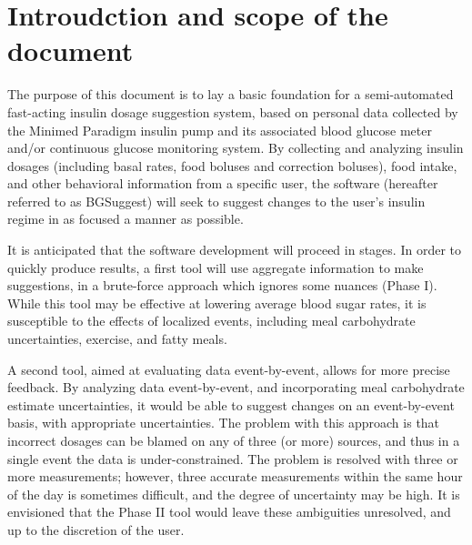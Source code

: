 



\def\hbac{\ensuremath{\text{HbA}_\text{1c}}}
\def\mgdl{\ensuremath{\text{mg/dL}}}
\def\sens{$\mgdl\over{U}$}
\def\carbratio{\ensuremath{R_\text{I-C}}}
\def\ric{\carbratio}
\def\rbas{\ensuremath{R_\text{Bas}}}



\thispagestyle{empty}
\section{Introudction and scope of the document}

The purpose of this document is to lay a basic foundation for a semi-automated fast-acting insulin 
dosage suggestion system, based on personal data collected by the Minimed Paradigm insulin pump and 
its associated blood glucose meter and/or continuous glucose monitoring system.
By collecting and analyzing insulin dosages (including basal
rates, food boluses and correction boluses), food intake, and other behavioral information from a 
specific user, the software (hereafter referred to as BGSuggest) will seek to suggest changes to 
the user's insulin regime in as focused a manner as possible.


It is anticipated that the software development will proceed in stages. In order to
quickly produce results, a first tool will use aggregate information to make suggestions, in a 
brute-force approach which ignores some nuances (Phase I). While this tool may be effective at 
lowering average blood sugar rates, it is susceptible to the effects of localized events, including 
meal carbohydrate uncertainties, exercise, and fatty meals.

A second tool, aimed at evaluating data event-by-event, allows for more precise feedback. By 
analyzing data event-by-event, and incorporating meal carbohydrate estimate uncertainties, it would 
be able to suggest changes on an event-by-event basis, with appropriate uncertainties. The problem 
with this approach is that incorrect dosages can be blamed on any of three (or more) sources, and 
thus in a single event the data is under-constrained. The problem is resolved with three or more 
measurements; however, three accurate measurements within the same hour of the day is sometimes 
difficult, and the degree of uncertainty may be high. It is envisioned that the Phase II tool would 
leave these ambiguities unresolved, and up to the discretion of the user.

